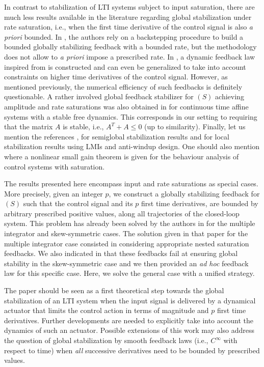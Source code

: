 \documentclass[letterpaper, 10pt]{article}
\begin{document}
In contrast to stabilization of LTI systems subject to input saturation, there are much less results available in the literature regarding global stabilization under rate saturation, i.e., when the first time derivative of the control signal is also {\it a priori} bounded. In \cite{Freeman:1998tp}, the authors rely on a backstepping procedure to build a bounded globally stabilizing feedback with a bounded rate, but the methodology does not allow to {\it a priori} impose a prescribed rate. In \cite{SFbound}, a dynamic feedback law inspired from \cite{Megretski96bibooutput} is constructed
and can even be generalized to take into account constraints on higher time derivatives of the control signal. However, as mentioned previously, the numerical efficiency of such feedbacks is definitely questionable.  A rather involved global feedback stabilizer for $(S)$ achieving amplitude and rate saturations was also obtained in \cite{SoSuAL} for continuous time affine systems with a stable free dynamics. This corresponds in our setting to requiring that the matrix $A$ is stable, i.e., $A^T+A\leq 0$ (up to similarity). Finally, let us mention the references \cite{lauvdal97}, \cite{lin1997semi} for semiglobal stabilization results and \cite{SilvaTarbouch03} for local stabilization results using LMIs and anti-windup design. One should also mention \cite{teel1996nonlinear} where a nonlinear small gain theorem is given for the behaviour analysis of control systems with saturation.

The results presented here encompass input and rate saturations as special cases. More precisely, given an integer $p$, we construct a globally stabilizing feedback for $(S)$ such that the control signal and its $p$ first time derivatives, are bounded by arbitrary prescribed positive values, along all trajectories of the closed-loop system. This problem has already been solved by the authors in \cite{LCC1} for the multiple integrator and skew-symmetric cases. The solution given in that paper for the multiple integrator case consisted in considering appropriate nested saturation feedbacks. We also indicated in \cite{LCC1} that these feedbacks fail at ensuring global stability in the skew-symmetric case and we then provided an {\it ad hoc} feedback law for this specific case. Here, we solve the general case with a unified strategy.


The paper should be seen as a first theoretical step towards the global stabilization of an LTI system when the input signal is delivered by a dynamical actuator that limits the control action in terms of magnitude and $p$ first time derivatives. Further developments are needed to explicitly take into account the dynamics of such an actuator. Possible extensions of this work may also address the question of global stabilization by smooth feedback laws (i.e., $C^\infty$ with respect to time) when \emph{all} successive derivatives need to be bounded by prescribed values.
\end{document}
